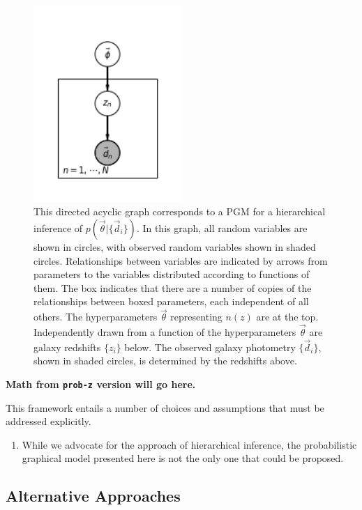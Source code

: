\documentclass[iop]{emulateapj}
\begin{document}
\begin{figure}
	\begin{center}
 		\includegraphics[width=0.5\textwidth]{fig/pgm.png}
		\caption{This directed acyclic graph corresponds to a PGM for a 
hierarchical inference of $p(\vec{\theta}|\{\vec{d}_{i}\})$.  In this graph, 
all random variables are shown in circles, with observed random variables shown 
in shaded circles.  Relationships between variables are indicated by arrows 
from parameters to the variables distributed according to functions of them.  
The box indicates that there are a number of copies of the relationships 
between boxed parameters, each independent of all others.  The hyperparameters 
$\vec{\theta}$ representing $n(z)$ are at the top.  Independently drawn from a 
function of the hyperparameters $\vec{\theta}$ are galaxy redshifts $\{z_{i}\}$ 
below.  The observed galaxy photometry $\{\vec{d}_{i}\}$, shown in shaded 
circles, is determined by the redshifts above.}
	\label{fig:pgm}
	\end{center}
\end{figure}

\textbf{Math from \texttt{prob-z} version will go here.}

This framework entails a number of choices and assumptions that must be 
addressed explicitly.

\begin{enumerate}
	\item While we advocate for the approach of hierarchical inference, the 
probabilistic graphical model presented here is not the only one that could be 
proposed.
\end{enumerate}

\subsection{Alternative Approaches}
\label{sec:others}
\end{document}
